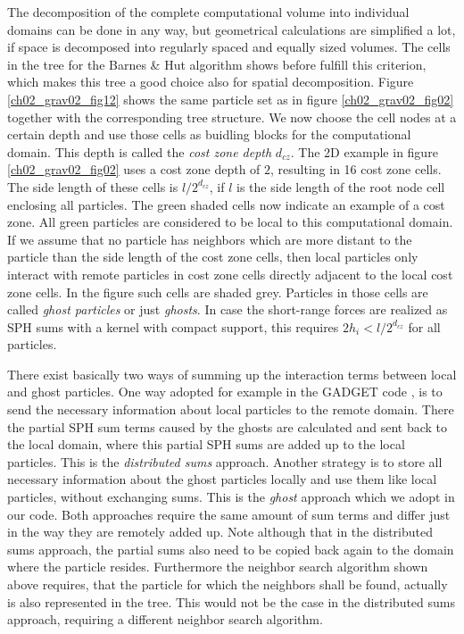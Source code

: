 The decomposition of the complete computational volume into individual domains can be done in any way, but geometrical calculations are simplified a lot, if space is decomposed into regularly spaced and equally sized volumes. The cells in the tree for the Barnes \& Hut algorithm shows before fulfill this criterion, which makes this tree a good choice also for spatial decomposition. Figure \ref{ch02_grav02_fig12} shows the same particle set as in figure \ref{ch02_grav02_fig02} together with the corresponding tree structure. We now choose the cell nodes at a certain depth and use those cells as buidling blocks for the computational domain. This depth is called the \emph{cost zone depth} $d_{cz}$. The 2D example in figure \ref{ch02_grav02_fig02} uses a cost zone depth of $2$, resulting in 16 cost zone cells. The side length of these cells is $l / 2^{d_{cz}}$, if $l$ is the side length of the root node cell enclosing all particles. The green shaded cells now indicate an example of a cost zone. All green particles are considered to be local to this computational domain. If we assume that no particle has neighbors which are more distant to the particle than the side length of the cost zone cells, then local particles only interact with remote particles in cost zone cells directly adjacent to the local cost zone cells. In the figure such cells are shaded grey. Particles in those cells are called \emph{ghost particles} or just \emph{ghosts}. In case the short-range forces are realized as SPH sums with a kernel with compact support, this requires $2h_i < l / 2^{d_{cz}}$ for all particles. 

There exist basically two ways of summing up the interaction terms between local and ghost particles. One way adopted for example in the GADGET code \citep{Springel:2005p51}, is to send the necessary information about local particles to the remote domain. There the partial SPH sum terms caused by the ghosts are calculated and sent back to the local domain, where this partial SPH sums are added up to the local particles. This is the \emph{distributed sums} approach. Another strategy is to store all necessary information about the ghost particles locally and use them like local particles, without exchanging sums. This is the \emph{ghost} approach which we adopt in our code. Both approaches require the same amount of sum terms and differ just in the way they are remotely added up. Note although that in the distributed sums approach, the partial sums also need to be copied back again to the domain where the particle resides. Furthermore the neighbor search algorithm shown above requires, that the particle for which the neighbors shall be found, actually is also represented in the tree. This would not be the case in the distributed sums approach, requiring a different neighbor search algorithm. 

